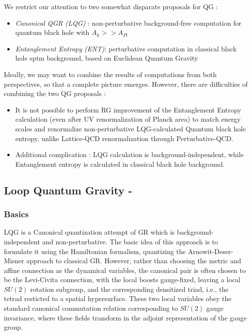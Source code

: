 \documentclass[11pt]{article}
\begin{document}
We restrict our attention to two somewhat disparate proposals for QG : 
\begin{itemize}
\item {{\it Canonical QGR (LQG)} : non-perturbative background-free computation for quantum black hole with $A_h >> A_{Pl}$}
\item {{\it Entanglement Entropy (ENT)}: perturbative computation in classical black hole sptm background, based on Euclidean Quantum Gravity}
\end{itemize}
Ideally, we may want to combine the results of computations from both perspectives, so that a complete picture emerges. However, there are difficulties of combining the two QG proposals :
\begin{itemize}
\item {It is not possible to perform RG improvement of the Entanglement Entropy calculation (even after UV renormalization of Planck area) to match energy scales and renormalize  non-perturbative LQG-calculated Quantum black hole entropy, unlike Lattice-QCD renormalization through Perturbative-QCD.}
\item {Additional complication : LQG calculation is background-independent, while Entanglement entropy is calculated in classical black hole background.}  
\end{itemize}

\subsection{Loop Quantum Gravity \cite{t21982}-\cite{thie2007}}

\subsubsection{Basics}

LQG is a Canonical quantization attempt of GR which is background-independent and non-perturbative. The basic idea of this approach is to formulate it using the Hamiltonian formalism, quantizing the Arnowit-Deser-Misner approach to classical GR. However, rather than choosing the metric and affine connection as the dynamical variables, the canonical pair is often chosen to be the Levi-Civita connection, with the local boosts gauge-fixed, leaving a local $SU(2)$ rotation subgroup, and the corresponding densitized triad, i.e., the tetrad resticted to a spatial hypersurface. These two local variables obey the standard canonical commutation relation corresponding to $SU(2)$ gauge invariance, where these fields transform in the adjoint representation of the gauge group.
\end{document}
